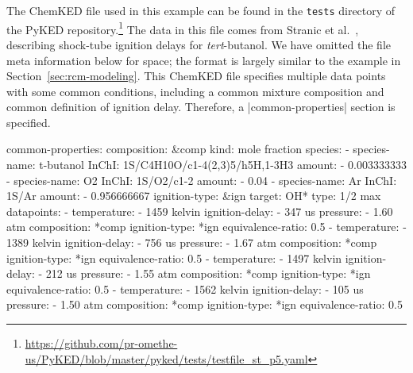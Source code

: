 \documentclass[12pt]{ijck}
\newcommand\ck{ChemKED}
\newcommand\pk{PyKED}
\begin{document}
The \ck{} file used in this example can be found in the \texttt{tests} directory of the \pk{}
repository.\footnote{\url{https://github.com/pr-omethe-us/PyKED/blob/master/pyked/tests/testfile_st_p5.yaml}}
The data in this file comes from Stranic et al.~\autocite{Stranic:2012}, describing
shock-tube ignition delays for \textit{tert}-butanol. We have omitted the file
meta information below for space; the format is largely similar to the example in Section~\ref{sec:rcm-modeling}.
%
This \ck{} file specifies multiple data points with some common
conditions, including a common mixture composition and common definition of
ignition delay. Therefore, a \yabox|common-properties| section is specified.
%
\begin{yamlbox}
common-properties:
  composition: &comp
    kind: mole fraction
    species:
      - species-name: t-butanol
        InChI: 1S/C4H10O/c1-4(2,3)5/h5H,1-3H3
        amount:
          - 0.003333333
      - species-name: O2
        InChI:  1S/O2/c1-2
        amount:
          - 0.04
      - species-name: Ar
        InChI:  1S/Ar
        amount:
          - 0.956666667
  ignition-type: &ign
    target: OH*
    type: 1/2 max
datapoints:
  - temperature:
      - 1459 kelvin
    ignition-delay:
      - 347 us
    pressure:
      - 1.60 atm
    composition: *comp
    ignition-type: *ign
    equivalence-ratio: 0.5
  - temperature:
      - 1389 kelvin
    ignition-delay:
      - 756 us
    pressure:
      - 1.67 atm
    composition: *comp
    ignition-type: *ign
    equivalence-ratio: 0.5
  - temperature:
      - 1497 kelvin
    ignition-delay:
      - 212 us
    pressure:
      - 1.55 atm
    composition: *comp
    ignition-type: *ign
    equivalence-ratio: 0.5
  - temperature:
      - 1562 kelvin
    ignition-delay:
      - 105 us
    pressure:
      - 1.50 atm
    composition: *comp
    ignition-type: *ign
    equivalence-ratio: 0.5
\end{yamlbox}
\end{document}
